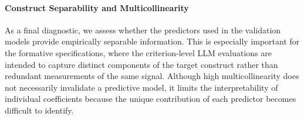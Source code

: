 









\paragraph{Construct Separability and Multicollinearity}

As a final diagnostic, we assess whether the predictors used in the validation models provide empirically separable information. This is especially important for the formative specifications, where the criterion-level LLM evaluations are intended to capture distinct components of the target construct rather than redundant measurements of the same signal. Although high multicollinearity does not necessarily invalidate a predictive model, it limits the interpretability of individual coefficients because the unique contribution of each predictor becomes difficult to identify.

